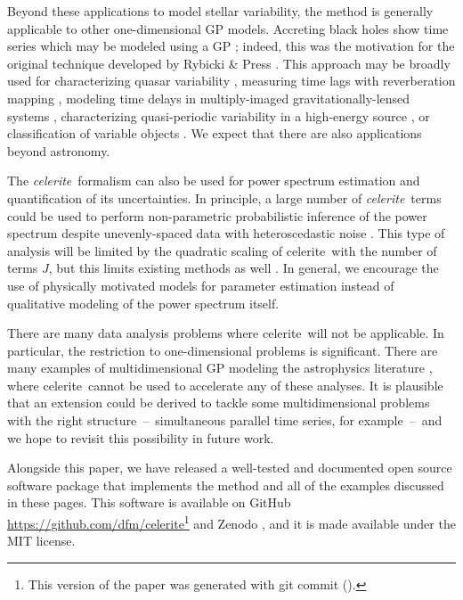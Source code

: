 \documentclass[manuscript, letterpaper]{aastex6}
\newcommand{\project}[1]{\textsf{#1}}
\newcommand{\celerite}{\project{celerite}}
\newcommand{\celeriteterm}{\emph{celerite}}
\begin{document}
Beyond these applications to model stellar variability, the method is
generally applicable to other one-dimensional GP models.
Accreting black holes show time series which may be modeled using a GP
\citep{Kelly:2014}; indeed, this was the motivation for the original technique
developed by Rybicki \& Press \citep{Rybicki:1992, Rybicki:1995}.
This approach may be broadly used for characterizing quasar variability
\citep{MacLeod:2010}, measuring time lags with reverberation mapping
\citep{Zu:2011, Pancoast:2014}, modeling time delays in multiply-imaged
gravitationally-lensed systems \citep{Press:1998}, characterizing
quasi-periodic variability in a high-energy source \citep{McAllister:2016}, or
classification of variable objects \citep{Zinn:2016}.
We expect that there are also applications beyond astronomy.

The \celeriteterm\ formalism can also be used for power spectrum estimation and
quantification of its uncertainties.
In principle, a large number of \celeriteterm\ terms could be used to perform
non-parametric probabilistic inference of the power spectrum despite
unevenly-spaced data with heteroscedastic noise \citep[for
example,][]{Wilson:2013, Kelly:2014}.
This type of analysis will be limited by the quadratic scaling of \celerite\
with the number of terms $J$, but this limits existing methods as well
\citep[CARMA models,][]{Kelly:2014}.
In general, we encourage the use of physically motivated models for parameter
estimation instead of qualitative modeling of the power spectrum itself.

There are many data analysis problems where \celerite\ will not be applicable.
In particular, the restriction to one-dimensional problems is significant.
There are many examples of multidimensional GP modeling the astrophysics
literature \citep[recent examples from the field of exoplanet characterization
include][]{Haywood:2014, Rajpaul:2015, Aigrain:2016}, where \celerite\ cannot
be used to accelerate any of these analyses.
It is plausible that an extension could be derived to tackle some
multidimensional problems with the right structure~--~simultaneous parallel
time series, for example~--~and we hope to revisit this possibility in future
work.

Alongside this paper, we have released a well-tested and documented open
source software package that implements the method and all of the examples
discussed in these pages.
This software is available on GitHub
\url{https://github.com/dfm/celerite}\footnote{This version of the paper was
generated with git commit \texttt{\githash} (\gitdate).} and Zenodo
\citep{Foreman-Mackey:2017}, and it is made available under the MIT license.
\end{document}
